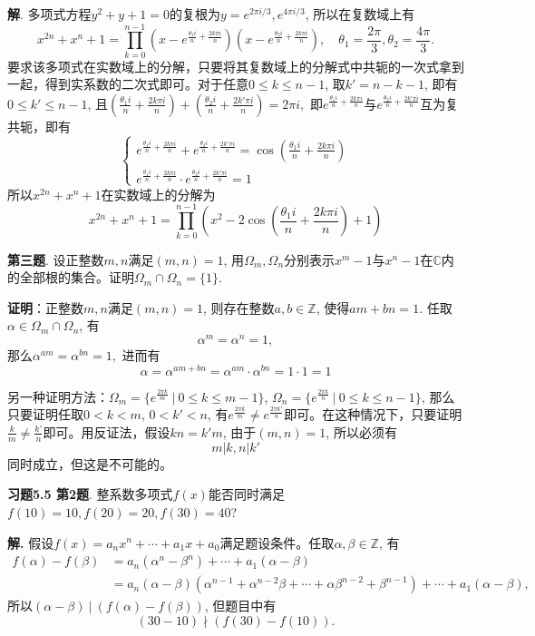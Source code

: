 {\bf 解}. 多项式方程$y^2 + y + 1 = 0$的复根为$y = e^{2\pi i/3}, e^{4\pi i/3}$, 所以在复数域上有
$$x^{2n} + x^n + 1 = \prod_{k=0}^{n-1} \left(x - e^{\frac{\theta_1 i}{n} + \frac{2k\pi i}{n}}\right) \left(x - e^{\frac{\theta_2 i}{n} + \frac{2k\pi i}{n}}\right), \quad \theta_1 = \frac{2\pi}{3}, \theta_2 = \frac{4\pi}{3}.$$
要求该多项式在实数域上的分解，只要将其复数域上的分解式中共轭的一次式拿到一起，得到实系数的二次式即可。对于任意$0\leqslant k \leqslant n-1$, 取$k' = n-k-1$, 即有$0\leqslant k' \leqslant n-1$, 且$(\frac{\theta_1 i}{n} + \frac{2k\pi i}{n}) + (\frac{\theta_2 i}{n} + \frac{2k'\pi i}{n}) = 2\pi i,$ 即$e^{\frac{\theta_1 i}{n} + \frac{2k\pi i}{n}}$与$e^{\frac{\theta_2 i}{n} + \frac{2k'\pi i}{n}}$互为复共轭，即有
$$
\begin{cases}
e^{\frac{\theta_1 i}{n} + \frac{2k\pi i}{n}} + e^{\frac{\theta_2 i}{n} + \frac{2k'\pi i}{n}} = \cos(\frac{\theta_1 i}{n} + \frac{2k\pi i}{n}) \\
e^{\frac{\theta_1 i}{n} + \frac{2k\pi i}{n}} \cdot e^{\frac{\theta_2 i}{n} + \frac{2k'\pi i}{n}} = 1
\end{cases}
$$
所以$x^{2n} + x^n + 1$在实数域上的分解为
$$x^{2n} + x^n + 1 = \prod_{k=0}^{n-1} \left( x^2 -2 \cos \left( \frac{\theta_1 i}{n} + \frac{2k\pi i}{n} \right) + 1 \right)$$

\newpageorvspace


{\bf 第三题}. 设正整数$m,n$满足$(m,n)=1$, 用$\Omega_m, \Omega_n$分别表示$x^m-1$与$x^n-1$在$\mathbb{C}$内的全部根的集合。证明$\Omega_m \cap \Omega_n = \{1\}$.

{\bf 证明}：正整数$m,n$满足$(m,n)=1$, 则存在整数$a,b\in\mathbb{Z}$, 使得$am+bn=1$. 任取$\alpha\in \Omega_m \cap \Omega_n$, 有
$$\alpha^m = \alpha^n = 1,$$
那么$\alpha^{am} = \alpha^{bn} = 1,$ 进而有
$$\alpha = \alpha^{am+bn} = \alpha^{am} \cdot \alpha^{bn} = 1 \cdot 1 = 1$$

另一种证明方法：$\Omega_m = \{ e^{\frac{2\pi k}{m}} \ |\ 0\leqslant k \leqslant m-1 \}$, $\Omega_n = \{ e^{\frac{2\pi k}{n}} \ |\ 0\leqslant k \leqslant n-1 \}$, 那么只要证明任取$0 < k < m$, $0 < k' < n$, 有$e^{\frac{2\pi k}{m}} \neq e^{\frac{2\pi k'}{n}}$即可。在这种情况下，只要证明$\frac{k}{m} \neq \frac{k'}{n}$即可。用反证法，假设$kn=k'm$, 由于$(m,n)=1$, 所以必须有
$$m|k, n|k'$$
同时成立，但这是不可能的。


\newpageorvspace


{\bf 习题5.5 第2题}. 整系数多项式$f(x)$能否同时满足$f(10)=10, f(20)=20, f(30)=40$?

{\bf 解.} 假设$f(x) = a_nx^n + \cdots + a_1x + a_0$满足题设条件。任取$\alpha,\beta\in\mathbb{Z}$, 有
\begin{align*}
f(\alpha) - f(\beta) & = a_n(\alpha^n-\beta^n) + \cdots + a_1(\alpha-\beta) \\
& = a_n(\alpha-\beta)(\alpha^{n-1}+\alpha^{n-2}\beta+\cdots+\alpha\beta^{n-2}+\beta^{n-1}) + \cdots + a_1(\alpha-\beta),
\end{align*}
所以$(\alpha-\beta) \ |\ (f(\alpha) - f(\beta))$, 但题目中有
$$(30-10) \nmid (f(30)-f(10)).$$

